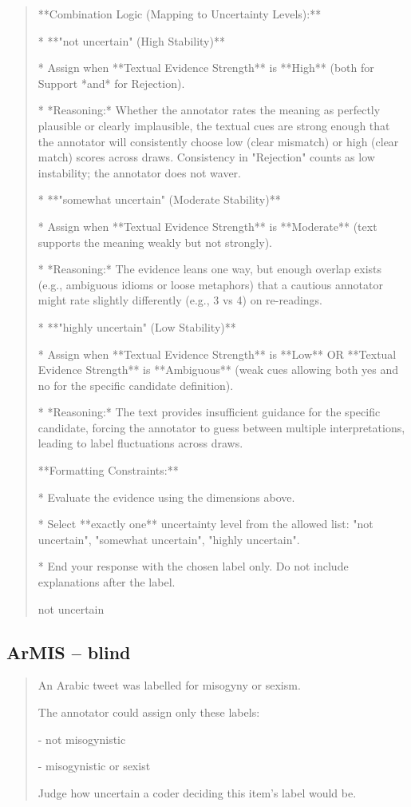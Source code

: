 \begin{quote}
**Combination Logic (Mapping to Uncertainty Levels):**



*   **"not uncertain" (High Stability)**

    *   Assign when **Textual Evidence Strength** is **High** (both for Support *and* for Rejection).

    *   *Reasoning:* Whether the annotator rates the meaning as perfectly plausible or clearly implausible, the textual cues are strong enough that the annotator will consistently choose low (clear mismatch) or high (clear match) scores across draws. Consistency in "Rejection" counts as low instability; the annotator does not waver.



*   **"somewhat uncertain" (Moderate Stability)**

    *   Assign when **Textual Evidence Strength** is **Moderate** (text supports the meaning weakly but not strongly).

    *   *Reasoning:* The evidence leans one way, but enough overlap exists (e.g., ambiguous idioms or loose metaphors) that a cautious annotator might rate slightly differently (e.g., 3 vs 4) on re-readings.



*   **"highly uncertain" (Low Stability)**

    *   Assign when **Textual Evidence Strength** is **Low** OR **Textual Evidence Strength** is **Ambiguous** (weak cues allowing both yes and no for the specific candidate definition).

    *   *Reasoning:* The text provides insufficient guidance for the specific candidate, forcing the annotator to guess between multiple interpretations, leading to label fluctuations across draws.



**Formatting Constraints:**

*   Evaluate the evidence using the dimensions above.

*   Select **exactly one** uncertainty level from the allowed list: "not uncertain", "somewhat uncertain", "highly uncertain".

*   End your response with the chosen label only. Do not include explanations after the label.

not uncertain
\end{quote}
\subsection*{ArMIS -- blind}
\begin{quote}\small
An Arabic tweet was labelled for misogyny or sexism.

The annotator could assign only these labels:

- not misogynistic

- misogynistic or sexist



Judge how uncertain a coder deciding this item's label would be.
\end{quote}
